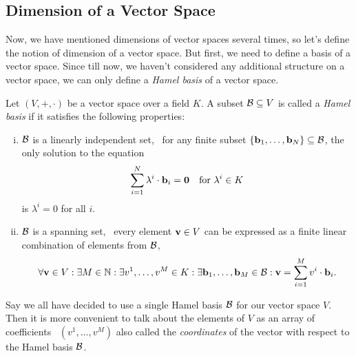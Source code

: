 \subsection{Dimension of a Vector Space}

Now, we have mentioned dimensions of vector spaces several times, so let's define the notion of dimension of a vector space. But first, we need to define a basis of a vector space. Since till now, we haven't considered any additional structure on a vector space, we can only define a \emph{Hamel basis} of a vector space.
\begin{definition}
    Let \((V, +, \cdot)\) be a vector space over a field \(K\). A subset \(\mathcal B \subseteq V\) is called a \emph{Hamel basis} if it satisfies the following properties:
    \begin{enumerate}[(i)]
        \item \(\mathcal B\) is a linearly independent set, \ie\ for any finite subset \(\qty{\vb{b}_1, \ldots, \vb{b}_N} \subseteq \mathcal B\), the only solution to the equation
              \begin{equation}
                  \sum_{i=1}^{N} \lambda^i \cdot \vb{b}_i = \vb{0} \quad \text{for } \lambda^i \in K
              \end{equation}
              is \(\lambda^i = 0\) for all \(i\).

        \item \(\mathcal B\) is a spanning set, \ie\ every element \(\vb{v} \in V\) can be expressed as a finite linear combination of elements from \(\mathcal B\), \ie\
              \begin{equation}
                  \forall \vb{v} \in V: \exists M \in \mathbb N: \exists v^1, \ldots, v^M \in K: \exists \vb{b}_1, \ldots, \vb{b}_M \in \mathcal B: \vb{v} = \sum_{i=1}^{M} v^i \cdot \vb{b}_i.
              \end{equation}
    \end{enumerate}
\end{definition}
Say we all have decided to use a single Hamel basis \(\mathcal B\) for our vector space \(V\). Then it is more convenient to talk about the elements of \(V\) as an array of coefficients \ie\ \((v^1, \ldots, v^M)\) also called the \emph{coordinates} of the vector with respect to the Hamel basis \(\mathcal B\).

